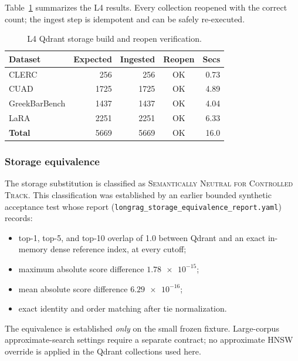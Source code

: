 \documentclass[11pt,a4paper]{article}
\begin{document}
Table~\ref{tab:l4} summarizes the L4 results. Every collection
reopened with the correct count; the ingest step is idempotent and
can be safely re-executed.

\begin{table}[h]
\centering
\caption{L4 Qdrant storage build and reopen verification.}
\label{tab:l4}
\small
\begin{tabular}{l r r c r}
\toprule
\textbf{Dataset} & \textbf{Expected} & \textbf{Ingested}
  & \textbf{Reopen} & \textbf{Secs} \\
\midrule
CLERC              & \num{256}   & \num{256}   & OK & \num{0.73} \\
CUAD               & \num{1725}  & \num{1725}  & OK & \num{4.89} \\
GreekBarBench      & \num{1437}  & \num{1437}  & OK & \num{4.04} \\
LaRA               & \num{2251}  & \num{2251}  & OK & \num{6.33} \\
\midrule
\textbf{Total}     & \num{5669}  & \num{5669}  & OK & \num{16.0} \\
\bottomrule
\end{tabular}
\end{table}

\subsubsection{Storage equivalence}
\label{sec:storage-equiv}
The storage substitution is classified as
\textsc{Semantically Neutral for Controlled Track}. This
classification was established by an earlier bounded synthetic
acceptance test whose report
(\texttt{longrag\_storage\_equivalence\_report.yaml}) records:

\begin{itemize}[leftmargin=1.5em,itemsep=0.15em]
  \item top-1, top-5, and top-10 overlap of \num{1.0} between Qdrant
    and an exact in-memory dense reference index, at every cutoff;
  \item maximum absolute score difference
    $\num{1.78e-15}$;
  \item mean absolute score difference $\num{6.29e-16}$;
  \item exact identity and order matching after tie normalization.
\end{itemize}

The equivalence is established \emph{only} on the small frozen
fixture. Large-corpus approximate-search settings require a separate
contract; no approximate HNSW override is applied in the Qdrant
collections used here.
\end{document}
